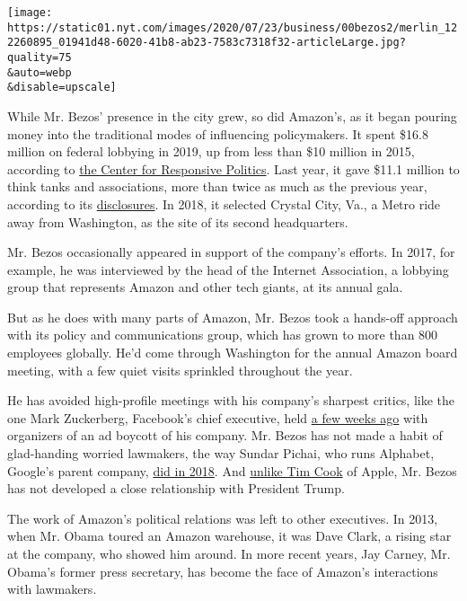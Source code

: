 \texttt{[image: https://static01.nyt.com/images/2020/07/23/business/00bezos2/merlin\_122260895\_01941d48-6020-41b8-ab23-7583c7318f32-articleLarge.jpg?quality=75\\\&auto=webp\\\&disable=upscale]}

While Mr. Bezos' presence in the city grew, so did Amazon's, as it began
pouring money into the traditional modes of influencing policymakers. It
spent \$16.8 million on federal lobbying in 2019, up from less than \$10
million in 2015, according to \href{https://www.opensecrets.org/}{the
Center for Responsive Politics}. Last year, it gave \$11.1 million to
think tanks and associations, more than twice as much as the previous
year, according to its
\href{https://s2.q4cdn.com/299287126/files/doc_downloads/political_expenditures_statement/2018-Political-Expenditures-Statement.pdf}{disclosures}.
In 2018, it selected Crystal City, Va., a Metro ride away from
Washington, as the site of its second headquarters.

Mr. Bezos occasionally appeared in support of the company's efforts. In
2017, for example, he was interviewed by the head of the Internet
Association, a lobbying group that represents Amazon and other tech
giants, at its annual gala.

But as he does with many parts of Amazon, Mr. Bezos took a hands-off
approach with its policy and communications group, which has grown to
more than 800 employees globally. He'd come through Washington for the
annual Amazon board meeting, with a few quiet visits sprinkled
throughout the year.

He has avoided high-profile meetings with his company's sharpest
critics, like the one Mark Zuckerberg, Facebook's chief executive, held
\href{https://www.nytimes.com/2020/07/07/technology/facebook-ad-boycott-civil-rights.html}{a
few weeks ago} with organizers of an ad boycott of his company. Mr.
Bezos has not made a habit of glad-handing worried lawmakers, the way
Sundar Pichai, who runs Alphabet, Google's parent company,
\href{https://www.nytimes.com/2018/09/28/technology/google-pichai-congress-testify.html}{did
in 2018}. And
\href{https://www.nytimes.com/2019/11/20/us/politics/trump-texas-apple-factory.html}{unlike
Tim Cook} of Apple, Mr. Bezos has not developed a close relationship
with President Trump.

The work of Amazon's political relations was left to other executives.
In 2013, when Mr. Obama toured an Amazon warehouse, it was Dave Clark, a
rising star at the company, who showed him around. In more recent years,
Jay Carney, Mr. Obama's former press secretary, has become the face of
Amazon's interactions with lawmakers.

